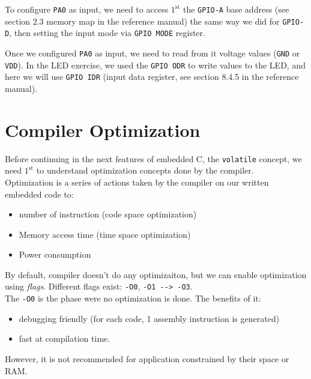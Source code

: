 To configure \verb|PA0| as input, we need to access $\mathrm{1}^\mathrm{st}$ the \verb|GPIO-A| base address (see section 2.3 memory map in the reference manual) the same way we did for \verb|GPIO-D|, then setting the input mode via \verb|GPIO MODE| register.

Once we configured \verb|PA0| as input, we need to read from it voltage values (\verb|GND| or \verb|VDD|). In the LED exercise, we used the \verb|GPIO ODR| to write values to the LED, and here we will use \verb|GPIO IDR| (input data register, see section 8.4.5 in the reference manual).


\newpage
\section{Compiler Optimization}

Before continuing in the next features of embedded C, the \verb|volatile| concept, we need $\mathrm{1}^\mathrm{st}$ to understand optimization concepts done by the compiler.\\

Optimization is a series of actions taken by the compiler on our written embedded code to:

\begin{itemize}
    \item number of instruction (code space optimization)
    
    \item Memory access time (time space optimization)
    
    \item Power consumption
    
\end{itemize}

By default, compiler doesn't do any optimizaiton, but we can enable optimization using \textit{flags}. Different flags exist: \verb|-O0|, \verb|-O1 --> -O3|.\\

The \verb|-O0| is the phase were no optimization is done. The benefits of it:

\begin{itemize}
    \item debugging friendly (for each code, 1 assembly instruction is generated)
    
    \item fast at compilation time.
\end{itemize}

However, it is not recommended for application constrained by their space or RAM. \\


